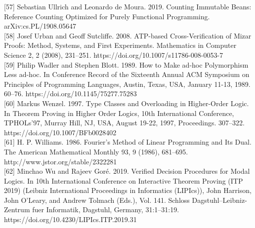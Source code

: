 \documentclass[
]{article}
\begin{document}
{[}57{]} Sebastian Ullrich and Leonardo de Moura. 2019. Counting
Immutable Beans: Reference Counting Optimized for Purely Functional
Programming. arXiv:cs.PL/1908.05647\\
{[}58{]} Josef Urban and Geoff Sutcliffe. 2008. ATP-based
Cross-Verification of Mizar Proofs: Method, Systems, and First
Experiments. Mathematics in Computer Science 2, 2 (2008), 231--251.
https://doi.org/10.1007/s11786-008-0053-7\\
{[}59{]} Philip Wadler and Stephen Blott. 1989. How to Make ad-hoc
Polymorphism Less ad-hoc. In Conference Record of the Sixteenth Annual
ACM Symposium on Principles of Programming Languages, Austin, Texas,
USA, January 11-13, 1989. 60--76. https://doi.org/10.1145/75277.75283\\
{[}60{]} Markus Wenzel. 1997. Type Classes and Overloading in
Higher-Order Logic. In Theorem Proving in Higher Order Logics, 10th
International Conference, TPHOLs'97, Murray Hill, NJ, USA, August 19-22,
1997, Proceedings. 307--322. https://doi.org/10.1007/BFb0028402\\
{[}61{]} H. P. Williams. 1986. Fourier's Method of Linear Programming
and Its Dual. The American Mathematical Monthly 93, 9 (1986), 681--695.
http://www.jstor.org/stable/2322281\\
{[}62{]} Minchao Wu and Rajeev Goré. 2019. Verified Decision Procedures
for Modal Logics. In 10th International Conference on Interactive
Theorem Proving (ITP 2019) (Leibniz International Proceedings in
Informatics (LIPIcs)), John Harrison, John O'Leary, and Andrew Tolmach
(Eds.), Vol. 141. Schloss Dagstuhl--Leibniz-Zentrum fuer Informatik,
Dagstuhl, Germany, 31:1--31:19.
https://doi.org/10.4230/LIPIcs.ITP.2019.31
\end{document}
